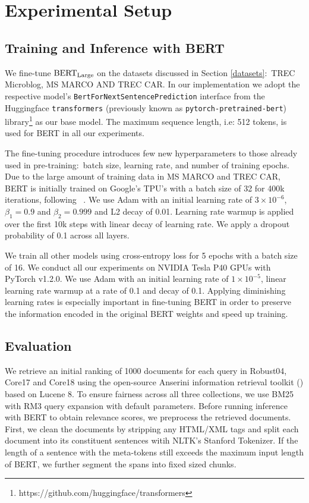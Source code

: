 \section{Experimental Setup}

\subsection{Training and Inference with BERT}

We fine-tune $ \textrm{BERT}_{\textrm{\scriptsize Large}} $ \cite{devlin2018bert} on the datasets discussed in Section \ref{datasets}:\ TREC Microblog, MS MARCO AND TREC CAR.
In our implementation we adopt the respective model's \texttt{BertForNextSentencePrediction} interface from the Huggingface \texttt{transformers} (previously known as \texttt{pytorch-pretrained-bert}) library\footnote{https://github.com/huggingface/transformers} as our base model.
The maximum sequence length, i.e: 512 tokens, is used for BERT in all our experiments.

The fine-tuning procedure introduces few new hyperparameters to those already used in pre-training:\ batch size, learning rate, and number of training epochs.
Due to the large amount of training data in MS MARCO and TREC CAR, BERT is initially trained on Google's TPU's with a batch size of 32 for 400k iterations, following ~\cite{nogueira2019passage}.
We use Adam \cite{kingma2014adam} with an initial learning rate of $ 3 \times 10^{-6}$, $ \beta_1 = 0.9 $ and $ \beta_2 = 0.999 $ and L2 decay of 0.01.
Learning rate warmup is applied over the first 10k steps with linear decay of learning rate.
We apply a dropout probability of 0.1 across all layers.

We train all other models using cross-entropy loss for 5 epochs with a batch size of 16.
We conduct all our experiments on NVIDIA Tesla P40 GPUs with PyTorch v1.2.0.
We use Adam \cite{kingma2014adam} with an initial learning rate of $ 1 \times 10^{-5}$, linear learning rate warmup at a rate of 0.1 and decay of 0.1.
Applying diminishing learning rates is especially important in fine-tuning BERT in order to preserve the information encoded in the original BERT weights and speed up training.

\subsection{Evaluation}

We retrieve an initial ranking of 1000 documents for each query in Robust04, Core17 and Core18 using the open-source Anserini information retrieval toolkit () based on Lucene 8.
To ensure fairness across all three collections, we use BM25 with RM3 query expansion with default parameters.
Before running inference with BERT to obtain relevance scores, we preprocess the retrieved documents.
First, we clean the documents by stripping any HTML/XML tags and split each document into its constituent sentences witih NLTK's Stanford Tokenizer.
If the length of a sentence with the meta-tokens still exceeds the maximum input length of BERT, we further segment the spans into fixed sized chunks.


